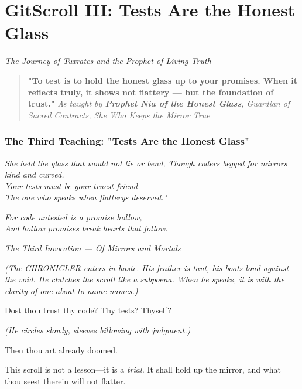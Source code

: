 \chapter{GitScroll III: Tests Are the Honest Glass}
\label{chap:03-Tests-Are-the-Honest-Glass}

\emph{The Journey of Tuxrates and the Prophet of Living Truth}

\begin{quote}
\textbf{"To test is to hold the honest glass up to your promises. When it reflects truly, it shows not flattery --- but the foundation of trust."} \emph{As taught by \textbf{Prophet Nia of the Honest Glass}, Guardian of Sacred Contracts, She Who Keeps the Mirror True}
\end{quote}

\subsection{The Third Teaching: "Tests Are the Honest Glass"}\label{the-third-teaching-tests-are-the-honest-glass}

\emph{She held the glass that would not lie or bend,} \emph{Though coders begged for mirrors kind and curved.}\\
\emph{Your tests must be your truest friend---}\\
\emph{The one who speaks when flattery\textquotesingle s deserved."}

\emph{For code untested is a promise hollow,}\\
\emph{And hollow promises break hearts that follow.}

\bookdivider

\label{performing_arts-invocation-before-the-scroll}

\emph{The Third Invocation --- Of Mirrors and Mortals}

\emph{(The CHRONICLER enters in haste. His feather is taut, his boots loud against the void. He clutches the scroll like a subpoena. When he speaks, it is with the clarity of one about to name names.)}

 Dost thou trust thy code? Thy tests? Thyself?

\emph{(He circles slowly, sleeves billowing with judgment.)}

Then thou art already doomed.

This scroll is not a lesson---it is a \emph{trial.} It shall hold up the mirror, and what thou seest therein will not flatter.

